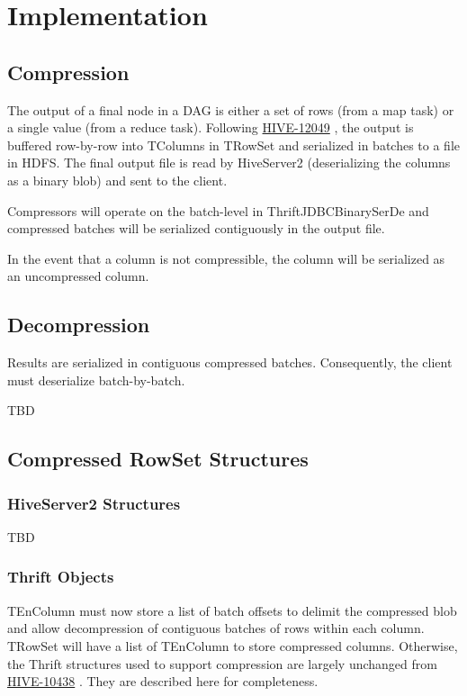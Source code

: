 \documentclass[11pt,a4paper]{article}
\begin{document}
\section{Implementation}
	
	\subsection{Compression}
		The output of a final node in a DAG is either a set of rows (from a map task) or a single value (from a reduce task).
		Following
		\href{https://issues.apache.org/jira/browse/HIVE-12049}{HIVE-12049}
		, the output is buffered row-by-row into TColumns in TRowSet and serialized in batches to a file in HDFS.
		The final output file is read by HiveServer2 (deserializing the columns as a binary blob) and sent to the client.
		
		Compressors will operate on the batch-level in ThriftJDBCBinarySerDe and compressed batches will be serialized contiguously in the output file. 
		
		In the event that a column is not compressible, the column will be serialized as an uncompressed column.
		
	\subsection{Decompression}
		Results are serialized in contiguous compressed batches. Consequently, the client must deserialize batch-by-batch.
		
		TBD
		
	\subsection{Compressed RowSet Structures}
		\subsubsection{HiveServer2 Structures}
			TBD
		
		\subsubsection{Thrift Objects}
			TEnColumn must now store a list of batch offsets to delimit the compressed blob and allow decompression of contiguous batches of rows within each column. TRowSet will have a list of TEnColumn to store compressed columns.
			Otherwise, the Thrift structures used to support compression are largely unchanged from 
			\href{https://issues.apache.org/jira/browse/HIVE-10438}{HIVE-10438}
			. They are described here for completeness.
			
\end{document}
